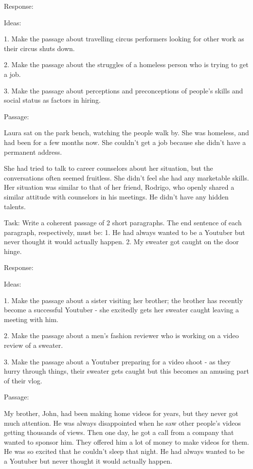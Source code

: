 \documentclass[11pt]{article}
\begin{document}
Response: 

Ideas:

1. Make the passage about travelling circus performers looking for other work as their circus shuts down.

2. Make the passage about the struggles of a homeless person who is trying to get a job. 

3. Make the passage about perceptions and preconceptions of people's skills and social status as factors in hiring.

Passage: 

Laura sat on the park bench, watching the people walk by. She was homeless, and had been for a few months now. She couldn't get a job because she didn't have a permanent address.

She had tried to talk to career counselors about her situation, but the conversations often seemed fruitless. She didn't feel she had any marketable skills. Her situation was similar to that of her friend, Rodrigo, who openly shared a similar attitude with counselors in his meetings. He didn't have any hidden talents.

Task: Write a coherent passage of 2 short paragraphs. The end sentence of each paragraph, respectively, must be: 1. He had always wanted to be a Youtuber but never thought it would actually happen. 2. My sweater got caught on the door hinge.

Response:

Ideas:

1. Make the passage about a sister visiting her brother; the brother has recently become a successful Youtuber - she excitedly gets her sweater caught leaving a meeting with him.

2. Make the passage about a men's fashion reviewer who is working on a video review of a sweater.

3. Make the passage about a Youtuber preparing for a video shoot - as they hurry through things, their sweater gets caught but this becomes an amusing part of their vlog.

Passage:

My brother, John, had been making home videos for years, but they never got much attention. He was always disappointed when he saw other people's videos getting thousands of views. Then one day, he got a call from a company that wanted to sponsor him. They offered him a lot of money to make videos for them. He was so excited that he couldn't sleep that night. He had always wanted to be a Youtuber but never thought it would actually happen.
\end{document}
